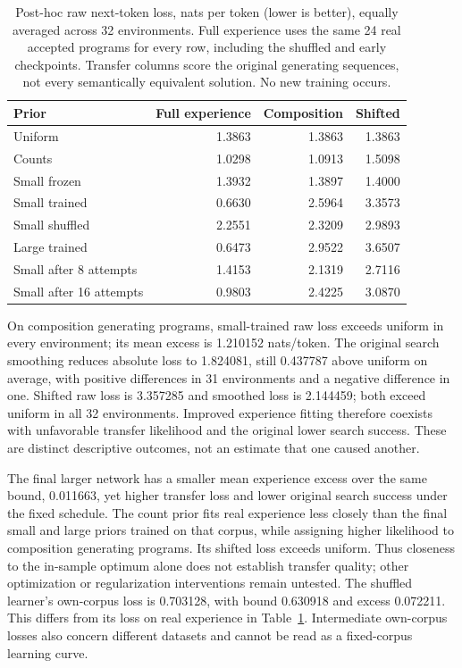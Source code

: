 \documentclass[11pt]{article}
\begin{document}
\begin{table}[ht]
\centering\small
\begin{tabular}{lrrr}
\toprule
Prior & Full experience & Composition & Shifted \\
\midrule
Uniform & 1.3863 & 1.3863 & 1.3863 \\
Counts & 1.0298 & 1.0913 & 1.5098 \\
Small frozen & 1.3932 & 1.3897 & 1.4000 \\
Small trained & 0.6630 & 2.5964 & 3.3573 \\
Small shuffled & 2.2551 & 2.3209 & 2.9893 \\
Large trained & 0.6473 & 2.9522 & 3.6507 \\
Small after 8 attempts & 1.4153 & 2.1319 & 2.7116 \\
Small after 16 attempts & 0.9803 & 2.4225 & 3.0870 \\
\bottomrule
\end{tabular}
\caption{Post-hoc raw next-token loss, nats per token (lower is better),
equally averaged across 32 environments. Full experience uses the same 24
real accepted programs for every row, including the shuffled and early
checkpoints. Transfer columns score the original generating sequences,
not every semantically equivalent solution. No new training occurs.}
\label{tab:i-likelihood}
\end{table}

On composition generating programs, small-trained raw loss exceeds uniform
in every environment; its mean excess is 1.210152 nats/token. The original
search smoothing reduces absolute loss to 1.824081, still 0.437787 above
uniform on average, with positive differences in 31 environments and a
negative difference in one. Shifted raw loss is 3.357285 and smoothed loss
is 2.144459; both exceed uniform in all 32 environments. Improved experience
fitting therefore coexists with unfavorable transfer likelihood and the
original lower search success. These are distinct descriptive outcomes,
not an estimate that one caused another.

The final larger network has a smaller mean experience excess over the same
bound, 0.011663, yet higher transfer loss and lower original search success
under the fixed schedule. The count prior fits real experience less closely
than the final small and large priors trained on that corpus, while assigning
higher likelihood to composition generating programs. Its shifted loss exceeds
uniform. Thus closeness to the in-sample optimum alone does not establish
transfer quality; other optimization or regularization interventions remain
untested. The shuffled learner's own-corpus loss is 0.703128, with bound
0.630918 and excess 0.072211. This differs from its loss on real experience
in Table~\ref{tab:i-likelihood}. Intermediate own-corpus losses also concern
different datasets and cannot be read as a fixed-corpus learning curve.
\end{document}

